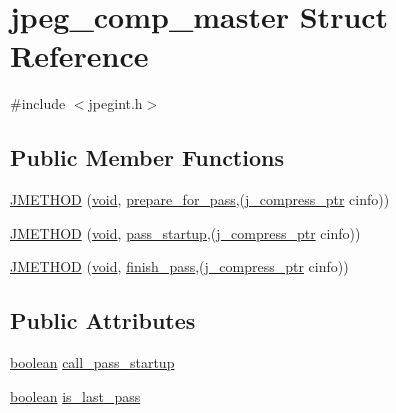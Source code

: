 \hypertarget{structjpeg__comp__master}{}\section{jpeg\+\_\+comp\+\_\+master Struct Reference}
\label{structjpeg__comp__master}


{\ttfamily \#include $<$jpegint.\+h$>$}

\subsection*{Public Member Functions}
\begin{DoxyCompactItemize}
\item 
\hyperlink{structjpeg__comp__master_afdbee5aedaedd9c6c9837b6bfd834a63}{J\+M\+E\+T\+H\+O\+D} (\hyperlink{png_8h_aa8c59027f9ab2769342f248709d68d17}{void}, \hyperlink{jcmaster_8c_a811c02b8de42399196fc3e0eb08c40a5}{prepare\+\_\+for\+\_\+pass},(\hyperlink{jpeglib_8h_add2a072c54e3a51550f4975f7ddb91e7}{j\+\_\+compress\+\_\+ptr} cinfo))
\item 
\hyperlink{structjpeg__comp__master_ac7e4391d1afe92c685cb4ffea5383d2c}{J\+M\+E\+T\+H\+O\+D} (\hyperlink{png_8h_aa8c59027f9ab2769342f248709d68d17}{void}, \hyperlink{jcmaster_8c_a41d1d2da456f1cd859c69823965becbc}{pass\+\_\+startup},(\hyperlink{jpeglib_8h_add2a072c54e3a51550f4975f7ddb91e7}{j\+\_\+compress\+\_\+ptr} cinfo))
\item 
\hyperlink{structjpeg__comp__master_a81648a22581acb403aa707a5e56bf993}{J\+M\+E\+T\+H\+O\+D} (\hyperlink{png_8h_aa8c59027f9ab2769342f248709d68d17}{void}, \hyperlink{jdarith_8c_a51cf466731c95bff0e472f382544d8c6}{finish\+\_\+pass},(\hyperlink{jpeglib_8h_add2a072c54e3a51550f4975f7ddb91e7}{j\+\_\+compress\+\_\+ptr} cinfo))
\end{DoxyCompactItemize}
\subsection*{Public Attributes}
\begin{DoxyCompactItemize}
\item 
\hyperlink{jmorecfg_8h_a7c6368b321bd9acd0149b030bb8275ed}{boolean} \hyperlink{structjpeg__comp__master_a72c70556604030b6b10d798f6c193e6f}{call\+\_\+pass\+\_\+startup}
\item 
\hyperlink{jmorecfg_8h_a7c6368b321bd9acd0149b030bb8275ed}{boolean} \hyperlink{structjpeg__comp__master_aac35b3d9e718376d1aacdde9df32e75d}{is\+\_\+last\+\_\+pass}
\end{DoxyCompactItemize}


